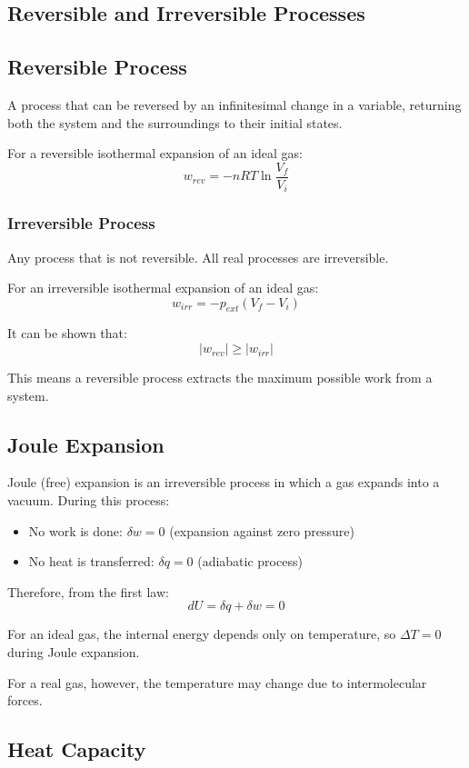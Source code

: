 \documentclass{article}
\theoremstyle{definition}
\begin{document}
\subsection{Reversible and Irreversible Processes}

\subsection{Reversible Process}
A process that can be reversed by an infinitesimal change in a variable, returning both the system and the surroundings to their initial states.

For a reversible isothermal expansion of an ideal gas:
\[
w_{rev} = -nRT\ln\frac{V_f}{V_i}
\]

\subsubsection{Irreversible Process}
Any process that is not reversible. All real processes are irreversible.

For an irreversible isothermal expansion of an ideal gas:
\[
w_{irr} = -p_{ext}(V_f - V_i)
\]

It can be shown that:
\[
|w_{rev}| \geq |w_{irr}|
\]

This means a reversible process extracts the maximum possible work from a system.

\subsection{Joule Expansion}

Joule (free) expansion is an irreversible process in which a gas expands into a vacuum. During this process:
\begin{itemize}
    \item No work is done: $\delta w = 0$ (expansion against zero pressure)
    \item No heat is transferred: $\delta q = 0$ (adiabatic process)
\end{itemize}

Therefore, from the first law:
\[
dU = \delta q + \delta w = 0
\]

For an ideal gas, the internal energy depends only on temperature, so $\Delta T = 0$ during Joule expansion. 

For a real gas, however, the temperature may change due to intermolecular forces.

\subsection{Heat Capacity}
\end{document}
